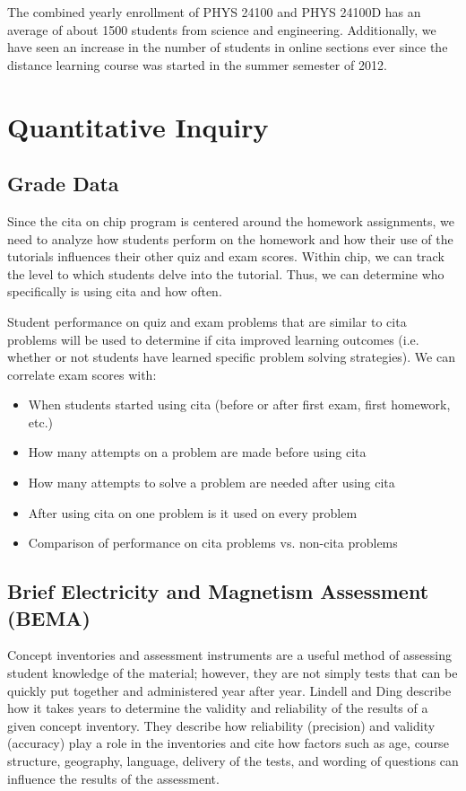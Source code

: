 The combined yearly enrollment of PHYS 24100 and PHYS 24100D has an average of about 1500 students from science and engineering. Additionally, we have seen an increase in the number of students in online sections ever since the distance learning course was started in the summer semester of 2012.

\section{Quantitative Inquiry}

\subsection{Grade Data}

Since the \gls{cita} on \gls{chip} program is centered around the homework assignments, we need to analyze how students perform on the homework and how their use of the tutorials influences their other quiz and exam scores. Within \gls{chip}, we can track the level to which students delve into the tutorial. Thus, we can determine who specifically is using \gls{cita} and how often.

Student performance on quiz and exam problems that are similar to \gls{cita} problems will be used to determine if \gls{cita} improved learning outcomes (i.e. whether or not students have learned specific problem solving strategies). We can correlate exam scores with:

\begin{itemize}
\item When students started using \gls{cita} (before or after first exam, first homework, etc.)
\item How many attempts on a problem are made before using \gls{cita}
\item How many attempts to solve a problem are needed after using \gls{cita}
\item After using \gls{cita} on one problem is it used on every problem
\item Comparison of performance on \gls{cita} problems vs. non-\gls{cita} problems
\end{itemize}

\subsection{Brief Electricity and Magnetism Assessment (BEMA)}

Concept inventories and assessment instruments are a useful method of assessing student knowledge of the material; however, they are not simply tests that can be quickly put together and administered year after year. Lindell and Ding describe how it takes years to determine the validity and reliability of the results of a given concept inventory. They describe how reliability (precision) and validity (accuracy) play a role in the inventories and cite how factors such as age, course structure, geography, language, delivery of the tests, and wording of questions can influence the results of the assessment\cite{lindell2012}.

